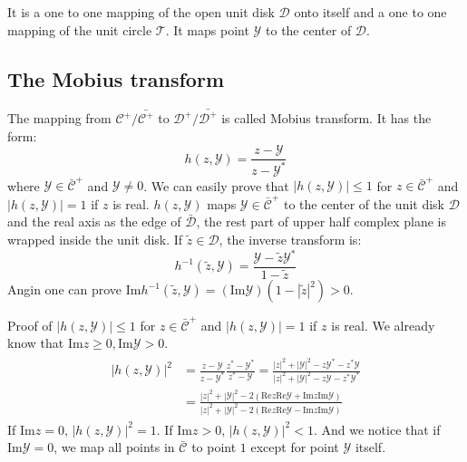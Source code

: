 \documentclass[
	preprint,%
	aps,
	prb,
	showpacs,	
	amsmath, amssymb]{revtex4-2}
\newcommand{\im}{ {\mathrm{Im}} }
\newcommand{\re}{ {\mathrm{Re}} }
\newcommand{\Y}{ {\mathcal{Y}} }
\newcommand{\C}{ {\mathcal{C}} }
\newcommand{\Cbar}{ {\bar{\mathcal{C}}} }
\newcommand{\D}{ {\mathcal{D}} }
\newcommand{\Dbar}{ {\bar{\mathcal{D}}} }
\begin{document}
It is a one to one mapping of the open unit disk $\D$ onto 
itself and a one to one mapping of the unit circle $\mathcal{T}$.
It maps point $\Y$ to the center of $\D$.


\subsection{The Mobius transform}
\label{appsub:mobius-transform}
The mapping from $\C^+/\bar{\C^+}$ to 
$\D^+/\bar{\D^+}$ is called Mobius transform.
It has the form:
\begin{equation}\label{eq:def-mobius-transform}
	h(z, \Y)  = \frac{z - \Y}{z - \Y^*}
\end{equation}
where $\Y \in \Cbar^+$ and $\Y \neq 0$. We can easily prove that 
$|h(z, \Y)| \leq 1$ for $z \in \Cbar^+$ and
$|h(z, \Y)| = 1$ if $z$ is real. $h(z, \Y)$ maps $\Y \in \Cbar^+$
to the center of the unit disk $\D$ and the real axis as the 
edge of $\Dbar$, the rest part of upper half complex plane is 
wrapped inside the unit disk. If $ \tilde{z} \in \D$, the inverse 
transform is:
\begin{equation}\label{eq:def-inv-mobius-transform}
	h^{-1}(\tilde{z}, \Y) = \frac{\Y - \tilde{z}\Y^*}{1 - \tilde{z}}
\end{equation}
Angin one can prove 
$\im h^{-1}(\tilde{z}, \Y) = (\im\Y)(1 - |\tilde{z}|^2 ) > 0$.

Proof of $|h(z, \Y)| \leq 1$ for $z \in \Cbar^+$ and
$|h(z, \Y)| = 1$ if $z$ is real. 
We already know that $\im z \geq 0,  \im \Y >0$.
\begin{align}
\begin{split}
|h(z, \Y)|^2 &= \frac{z - \Y}{z - \Y^*} \frac{z^* - \Y^*}{z^* - \Y} 
	  = \frac{|z|^2 + |\Y|^2 - z\Y^* - z^*\Y}{|z|^2 + |\Y|^2 - z\Y - z^*\Y^*}\\
	& = \frac{|z|^2 + |\Y|^2 - 2(\re z \re \Y  + \im z \im \Y)}
		{|z|^2 + |\Y|^2 - 2(\re z \re \Y  - \im z \im \Y)}
\end{split}
\end{align}
If $\im z = 0$, $|h(z, \Y)|^2 = 1$. If $\im z > 0$, $|h(z, \Y)|^2 < 1$.
And we notice that if $\im \Y = 0$, we map all points in $\Cbar$ to 
point $1$ except for point $\Y$ itself.


\end{document}
